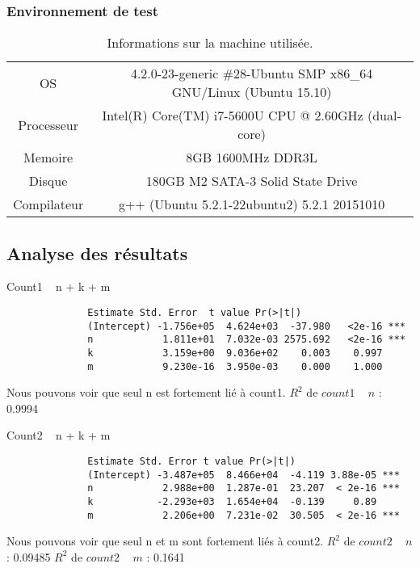 \subsubsection{Environnement de test}
\begin{table}[h!]
	\centering
	\caption{Informations sur la machine utilisée.}
	\label{tab:environnementFournie}
	\begin{tabular}{c|c}
		\toprule
		OS & 4.2.0-23-generic \#28-Ubuntu SMP x86\_64 GNU/Linux (Ubuntu 15.10)\\
		Processeur & Intel(R) Core(TM) i7-5600U CPU @ 2.60GHz (dual-core)\\
		Memoire & 8GB 1600MHz DDR3L\\
		Disque & 180GB M2 SATA-3 Solid State Drive\\
		Compilateur & g++ (Ubuntu 5.2.1-22ubuntu2) 5.2.1 20151010\\
		\bottomrule
	\end{tabular}
\end{table}

\subsection{Analyse des résultats}

Count1 ~ n + k + m
\begin{verbatim}
              Estimate Std. Error  t value Pr(>|t|)    
              (Intercept) -1.756e+05  4.624e+03  -37.980   <2e-16 ***
              n            1.811e+01  7.032e-03 2575.692   <2e-16 ***
              k            3.159e+00  9.036e+02    0.003    0.997    
              m            9.230e-16  3.950e-03    0.000    1.000   
\end{verbatim}
Nous pouvons voir que seul n est fortement lié à count1.
$R^2$ de $count1$ ~ $n$ : 0.9994

Count2 ~ n + k + m
\begin{verbatim}
              Estimate Std. Error t value Pr(>|t|)    
              (Intercept) -3.487e+05  8.466e+04  -4.119 3.88e-05 ***
              n            2.988e+00  1.287e-01  23.207  < 2e-16 ***
              k           -2.293e+03  1.654e+04  -0.139     0.89    
              m            2.206e+00  7.231e-02  30.505  < 2e-16 ***
\end{verbatim}
Nous pouvons voir que seul n et m sont fortement liés à count2.
$R^2$ de $count2$ ~ $n$ : 0.09485
$R^2$ de $count2$ ~ $m$ : 0.1641

